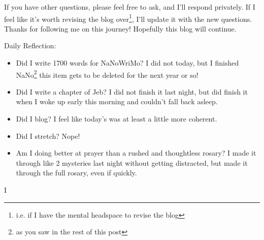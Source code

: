 \documentclass[12pt]{article}[titlepage]
\newcommand{\1}{\={a}}
\newcommand{\2}{\={e}}
\newcommand{\3}{\={\i}}
\newcommand{\4}{\=o}
\newcommand{\5}{\=u}
\newcommand{\6}{\={A}}
\renewcommand{\,}{\textsuperscript{,}}
\begin{document}
If you have other questions, please feel free to ask, and I'll respond privately.
If I feel like it's worth revising the blog over\footnote{i.e. if I have the mental headspace to revise the blog}, I'll update it with the new questions.
Thanks for following me on this journey!
Hopefully this blog will continue. 
 
Daily Reflection:
\begin{itemize}
\item Did I write 1700 words for NaNoWriMo? I did not today, but I finished NaNo\footnote{as you saw in the rest of this post} this item gets to be deleted for the next year or so! 
\item Did I write a chapter of Jeb? I did not finish it last night, but did finish it when I woke up early this morning and couldn't fall back asleep. 
\item Did I blog? I feel like today's was at least a little more coherent. 
\item Did I stretch? Nope! 
\item Am I doing better at prayer than a rushed and thoughtless rosary? I made it through like 2 mysteries last night without getting distracted, but made it through the full rosary, even if quickly. 
\end{itemize}
I
\end{document}
